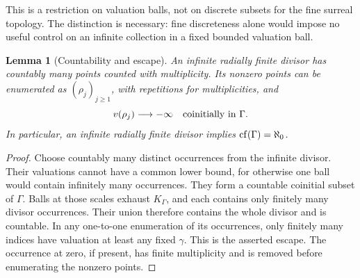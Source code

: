 \documentclass[11pt]{article}
\theoremstyle{plain}
\newtheorem{lemma}[lemma]{Lemma}
\theoremstyle{plain}
\theoremstyle{plain}
\theoremstyle{definition}
\theoremstyle{definition}
\theoremstyle{definition}
\theoremstyle{remark}
\newcommand{\K}{K_\Gamma}\newcommand{\E}{\mathcal E_\Gamma}
\begin{document}
This is a restriction on valuation balls, not on discrete subsets for
the fine surreal topology. The distinction is necessary: fine
discreteness alone would impose no useful control on an infinite
collection in a fixed bounded valuation ball.

\begin{lemma}[Countability and escape]\label{lem:divisor-countable}
An infinite radially finite divisor has countably many points counted
with multiplicity. Its nonzero points can be enumerated as
$(\rho_j)_{j\ge1}$, with repetitions for multiplicities, and
\[
 v(\rho_j)\longrightarrow-\infty
 \quad\hbox{coinitially in }\Gamma.
\]
In particular, an infinite radially finite divisor implies
$\operatorname{cf}(\Gamma)=\aleph_0$.
\end{lemma}
\begin{proof}
Choose countably many distinct occurrences from the infinite divisor.
Their valuations cannot have a common lower bound, for otherwise one
ball would contain infinitely many occurrences. They form a countable
coinitial subset of $\Gamma$. Balls at those scales exhaust $\K$,
and each contains only finitely many divisor occurrences. Their union
therefore contains the whole divisor and is countable. In any
one-to-one enumeration of its occurrences, only finitely many indices
have valuation at least any fixed $\gamma$. This is the asserted escape.
The occurrence at zero, if present, has finite multiplicity and is
removed before enumerating the nonzero points.
\end{proof}
\end{document}
